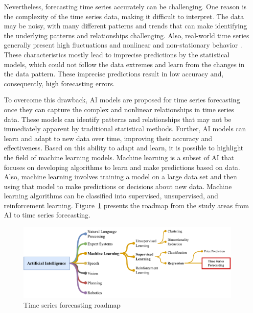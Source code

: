 Nevertheless, forecasting time series accurately can be challenging. One reason is the complexity of the time series data, making it difficult to interpret. The data may be noisy, with many different patterns and trends that can make identifying the underlying patterns and relationships challenging. Also, real-world time series generally present high fluctuations and nonlinear and non-stationary behavior \cite{stepchenko2017Nonlinear, tealab2017Forecasting}. These characteristics mostly lead to imprecise predictions by the statistical models, which could not follow the data extremes and learn from the changes in the data pattern. These imprecise predictions result in low accuracy and, consequently, high forecasting errors.

To overcome this drawback, \ac{AI} models are proposed for time series forecasting once they can capture the complex and nonlinear relationships in time series data. These models can identify patterns and relationships that may not be immediately apparent by traditional statistical methods. Further, \ac{AI} models can learn and adapt to new data over time, improving their accuracy and effectiveness. Based on this ability to adapt and learn, it is possible to highlight the field of machine learning models. Machine learning is a subset of \ac{AI} that focuses on developing algorithms to learn and make predictions based on data. Also, machine learning involves training a model on a large data set and then using that model to make predictions or decisions about new data. Machine learning algorithms can be classified into supervised, unsupervised, and reinforcement learning. Figure~\ref{fig:ml_path} presents the roadmap from the study areas from \ac{AI} to time series forecasting.

\begin{figure}[htb!]
    \centering
    \includegraphics[width=\linewidth]{Media/roadmap.pdf}
    \caption{Time series forecasting roadmap}
    \label{fig:ml_path}
\end{figure}

